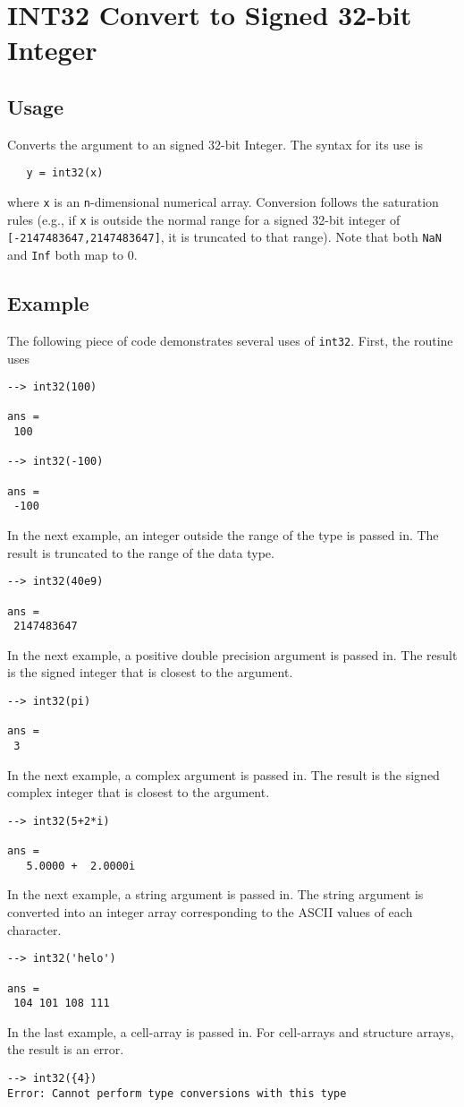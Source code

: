 \section{INT32 Convert to Signed 32-bit Integer}

\subsection{Usage}

Converts the argument to an signed 32-bit Integer.  The syntax
for its use is
\begin{verbatim}
   y = int32(x)
\end{verbatim}
where \verb|x| is an \verb|n|-dimensional numerical array.  Conversion
follows the saturation rules (e.g., if \verb|x| is outside the normal
range for a signed 32-bit integer of \verb|[-2147483647,2147483647]|, 
it is truncated to that range).  Note that both \verb|NaN| and \verb|Inf| both map to 0.
\subsection{Example}

The following piece of code demonstrates several uses of \verb|int32|.  First, the routine uses
\begin{verbatim}
--> int32(100)

ans = 
 100 

--> int32(-100)

ans = 
 -100 
\end{verbatim}
In the next example, an integer outside the range  of the type is passed in.  The 
result is truncated to the range of the data type.
\begin{verbatim}
--> int32(40e9)

ans = 
 2147483647 
\end{verbatim}
In the next example, a positive double precision argument is passed in.  The 
result is the signed integer that is closest to the argument.
\begin{verbatim}
--> int32(pi)

ans = 
 3 
\end{verbatim}
In the next example, a complex argument is passed in.  The result is the signed 
complex integer that is closest to the argument.
\begin{verbatim}
--> int32(5+2*i)

ans = 
   5.0000 +  2.0000i 
\end{verbatim}
In the next example, a string argument is passed in.  The string argument is 
converted into an integer array corresponding to the ASCII values of each character.
\begin{verbatim}
--> int32('helo')

ans = 
 104 101 108 111 
\end{verbatim}
In the last example, a cell-array is passed in.  For cell-arrays and structure 
arrays, the result is an error.
\begin{verbatim}
--> int32({4})
Error: Cannot perform type conversions with this type
\end{verbatim}
